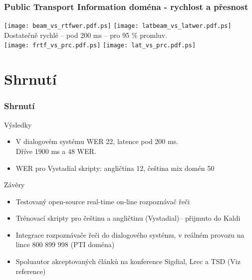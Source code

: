 \begin{frame}\frametitle{Public Transport Information doména - rychlost a přesnost} 
    \texttt{[image: beam\_vs\_rtfwer.pdf.ps]}
    \texttt{[image: latbeam\_vs\_latwer.pdf.ps]}
    \\  Dostatečně rychlé -- pod 200 ms -- pro 95 \% promluv. \\
    \texttt{[image: frtf\_vs\_prc.pdf.ps]}
    \texttt{[image: lat\_vs\_prc.pdf.ps]}
\end{frame}


\section{Shrnutí} %

\begin{frame}\frametitle{Shrnutí} 
    \begin{exampleblock}{Výsledky}
    \begin{itemize}
        \item V dialogovém systému WER 22, latence pod 200 ms. \\ {\scriptsize Dříve 1900 ms a 48 WER}. 
        \item WER pro Vystadial skripty: angličtina 12, čeština mix domén 50
    \end{itemize}
    \end{exampleblock}
    \begin{block}{Závěry}
    \begin{itemize}
        \item Testovaný open-source real-time on-line rozpoznávač řeči
        \item Trénovací skripty pro češtinu a angličtinu {\scriptsize (Vystadial)}-- přijmuto do Kaldi
        \item Integrace rozpoznávače řeči do dialogového systému, v reálném provozu na lince 800 899 998 (PTI doména)
        \item Spoluautor akceptovaných článků na konference Sigdial, Lrec a TSD (Viz reference) 
    \end{itemize}
    \end{block}
\end{frame}


